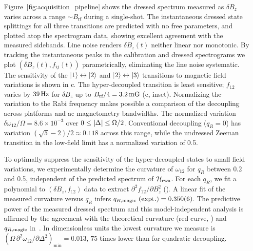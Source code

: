 \documentclass[aps,prl,reprint,superscriptaddress,floatfix]{revtex4-1}
\begin{document}
Figure~\ref{fig:acquisition_pipeline} shows the dressed spectrum measured as $\delta B_z$ varies across a range $\sim B_{\text{rf}}$ during a single-shot.
The instantaneous dressed state splittings for all three transitions are predicted with no free parameters, and plotted atop the spectrogram data, showing excellent agreement with the measured sidebands.
Line noise renders $\delta B_z(t)$ neither linear nor monotonic.
By tracking the instantaneous peaks in the calibration and dressed spectrograms we plot $(\delta B_z(t), f_{ij}(t))$ parametrically, eliminating the line noise systematic.
The sensitivity of the $\vert 1 \rangle  \leftrightarrow \vert 2 \rangle $ and $\vert 2 \rangle  \leftrightarrow \vert 3 \rangle $ transitions to magnetic field variations is shown in c.
The hyper-decoupled transition is least sensitive; $f_{12}$ varies by $\unit[39]{Hz}$ for $\delta B_z$ up to $B_{\text{rf}}/4 = \unit[3.2]{mG}$ (c, inset).
Normalizing the variation to the Rabi frequency makes possible a comparison of the decoupling across platforms and ac magnetometry bandwidths. 
The normalized variation $\delta \omega_{12}/\Omega = 8.6\times10^{-3}$ over $0\leq \vert \Delta \vert  \leq \Omega/2$.
Conventional decoupling ($q_R=0$) has variation $(\sqrt{5}-2)/2 \approx 0.118$ across this range, while the undressed Zeeman transition in the low-field limit has a normalized variation of 0.5.

To optimally suppress the sensitivity of the hyper-decoupled states to small field variations, we experimentally determine the curvature of $\omega_{12}$  for $q_R$ between 0.2 and 0.5, independent of the predicted spectrum of $\mathcal{H}_{\text{rwa}}$.
For each $q_R$, we fit a polynomial to $(\delta B_z, f_{12})$ data to extract $\partial^2 f_{12}/\partial B_z^2$ ().
A linear fit of the measured curvature versus $q_R$ infers $q_{R,\text{magic}}\text{ (expt.)} = 0.350(6)$.
The predictive power of the measured dressed spectrum and this model-independent analysis is affirmed by the agreement with the theoretical curvature (red curve, ) and $q_{R,\text{magic}}$ in~.
In dimensionless units the lowest curvature we measure is $\left(\Omega\, \partial^2\omega_{12}/\partial \Delta^2\right)_{\text{min}} = 0.013$, $75$ times lower than for quadratic decoupling.
\end{document}
